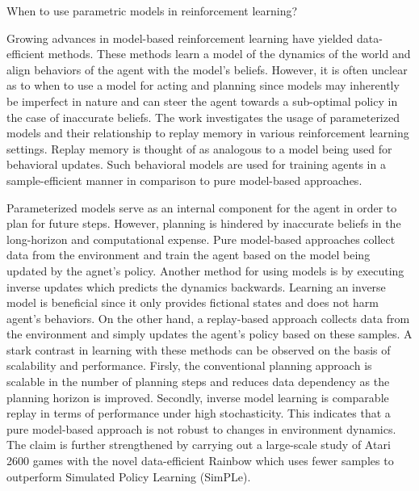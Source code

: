 \documentclass[10pt,letterpaper]{article}
\begin{document}
\begin{center}
  \large{ When to use parametric models in reinforcement learning?}
\end{center}

Growing advances in model-based reinforcement learning have yielded data-efficient methods. These methods learn a model of the dynamics of the world and align behaviors of the agent with the model's beliefs. However, it is often unclear as to when to use a model for acting and planning since models may inherently be imperfect in nature and can steer the agent towards a sub-optimal policy in the case of inaccurate beliefs. The work investigates the usage of parameterized models and their relationship to replay memory in various reinforcement learning settings. Replay memory is thought of as analogous to a model being used for behavioral updates. Such behavioral models are used for training agents in a sample-efficient manner in comparison to pure model-based approaches.

Parameterized models serve as an internal component for the agent in order to plan for future steps. However, planning is hindered by inaccurate beliefs in the long-horizon and computational expense. Pure model-based approaches collect data from the environment and train the agent based on the model being updated by the agnet's policy. Another method for using models is by executing inverse updates which predicts the dynamics backwards. Learning an inverse model is beneficial since it only provides fictional states and does not harm agent's behaviors. On the other hand, a replay-based approach collects data from the environment and simply updates the agent's policy based on these samples. A stark contrast in learning with these methods can be observed on the basis of scalability and performance. Firsly, the conventional planning approach is scalable in the number of planning steps and reduces data dependency as the planning horizon is improved. Secondly, inverse model learning is comparable replay in terms of performance under high stochasticity. This indicates that a pure model-based approach is not robust to changes in environment dynamics. The claim is further strengthened by carrying out a large-scale study of Atari 2600 games with the novel data-efficient Rainbow which uses fewer samples to outperform Simulated Policy Learning (SimPLe). 
\end{document}
